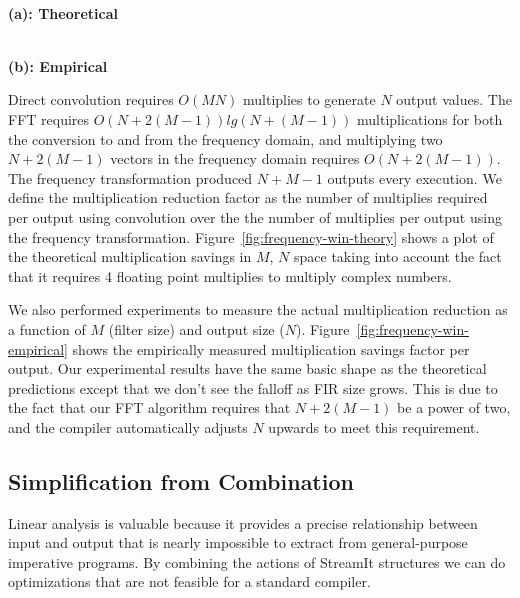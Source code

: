 \begin{figure*}[t]
\center
\begin{minipage}{3.4 in}
\center
\epsfxsize=3.2in
 \\
{\bf (a): Theoretical}
\end{minipage} 
\begin{minipage}{3.4 in}
\center
\epsfxsize=3.2in
 \\
{\bf (b): Empirical}
\end{minipage}
\caption{Plots showing the theoretical and emphirical multiplication reduction factor as a function of the size of the FIR ($M$) and the number of outputs produced ($N$). The dark regions denote an increase in the required number of multiplications.}
\label{fig:frequency-win-theory}
\vspace{-12pt}
\end{figure*}


Direct convolution requires $O(MN)$ multiplies to generate $N$ output
values.  The FFT requires $O(N+2(M-1))lg(N+(M-1))$ multiplications for both the
conversion to and from the frequency domain, and multiplying two $N+2(M-1)$
vectors in the frequency domain requires $O(N+2(M-1))$. The frequency transformation 
produced $N+M-1$ outputs every execution.
We define the multiplication reduction factor as the number of
multiplies required per output using convolution over the 
the number of multiplies per output using the frequency transformation. 
Figure~\ref{fig:frequency-win-theory} shows a plot of the theoretical multiplication savings
in $M$, $N$ space taking into account the fact that it requires 4 floating point 
multiplies to multiply complex numbers.


We also performed experiments to measure the actual multiplication reduction
as a function of $M$ (filter size) and output size ($N$).
Figure~\ref{fig:frequency-win-empirical} shows the empirically measured
multiplication savings factor per output. Our experimental results have the same basic 
shape as the theoretical predictions except that we don't see the falloff as 
FIR size grows. This is due to the fact that
our FFT algorithm requires that $N+2(M-1)$ be a power of two, and the compiler
automatically adjusts $N$ upwards to meet this requirement.


\subsection{Simplification from Combination}
Linear analysis is valuable because it provides a precise relationship
between input and output that is nearly impossible to extract from
general-purpose imperative programs. By combining the actions of
StreamIt structures we can do optimizations that are not feasible for
a standard compiler.

